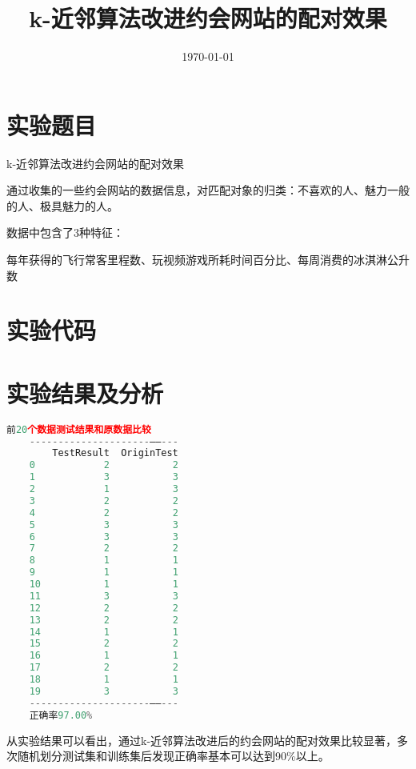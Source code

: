 \documentclass{../source/Experiment}
\title{k-近邻算法改进约会网站的配对效果}
\date{\today}
\begin{document}
    \makecover
    \section{实验题目}
    k-近邻算法改进约会网站的配对效果

    通过收集的一些约会网站的数据信息，对匹配对象的归类：不喜欢的人、魅力一般的人、极具魅力的人。

    数据中包含了3种特征：

    每年获得的飞行常客里程数、玩视频游戏所耗时间百分比、每周消费的冰淇淋公升数
    
    \section{实验代码}
    
    \section{实验结果及分析}
    \begin{lstlisting}[language=Python]
    前20个数据测试结果和原数据比较
    ---------------------——---
        TestResult  OriginTest
    0            2           2
    1            3           3
    2            1           3
    3            2           2
    4            2           2
    5            3           3
    6            3           3
    7            2           2
    8            1           1
    9            1           1
    10           1           1
    11           3           3
    12           2           2
    13           2           2
    14           1           1
    15           2           2
    16           1           1
    17           2           2
    18           1           1
    19           3           3
    ---------------------——---
    正确率97.00%
    \end{lstlisting}

    从实验结果可以看出，通过k-近邻算法改进后的约会网站的配对效果比较显著，多次随机划分测试集和训练集后发现正确率基本可以达到90\%以上。
\end{document}

